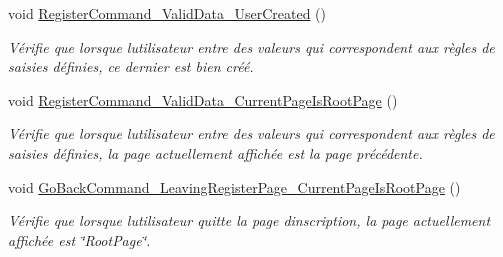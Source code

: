 \begin{DoxyCompactItemize}
void \hyperlink{class_boxes_1_1_tests_1_1_register_view_model_tests_ac160eca13893c7fe0c8df0c2a0faa116}{Register\+Command\+\_\+\+Valid\+Data\+\_\+\+User\+Created} ()
\begin{DoxyCompactList}\small\item\em Vérifie que lorsque l\textquotesingle{}utilisateur entre des valeurs qui correspondent aux règles de saisies définies, ce dernier est bien créé. \end{DoxyCompactList}\item 
void \hyperlink{class_boxes_1_1_tests_1_1_register_view_model_tests_a44f32fd8750164cd8c4175ac84323226}{Register\+Command\+\_\+\+Valid\+Data\+\_\+\+Current\+Page\+Is\+Root\+Page} ()
\begin{DoxyCompactList}\small\item\em Vérifie que lorsque l\textquotesingle{}utilisateur entre des valeurs qui correspondent aux règles de saisies définies, la page actuellement affichée est la page précédente. \end{DoxyCompactList}\item 
void \hyperlink{class_boxes_1_1_tests_1_1_register_view_model_tests_a7ccccb692593a356b79cfecb0114ea46}{Go\+Back\+Command\+\_\+\+Leaving\+Register\+Page\+\_\+\+Current\+Page\+Is\+Root\+Page} ()
\begin{DoxyCompactList}\small\item\em Vérifie que lorsque l\textquotesingle{}utilisateur quitte la page d\textquotesingle{}inscription, la page actuellement affichée est \char`\"{}\+Root\+Page\char`\"{}. \end{DoxyCompactList}\end{DoxyCompactItemize}
